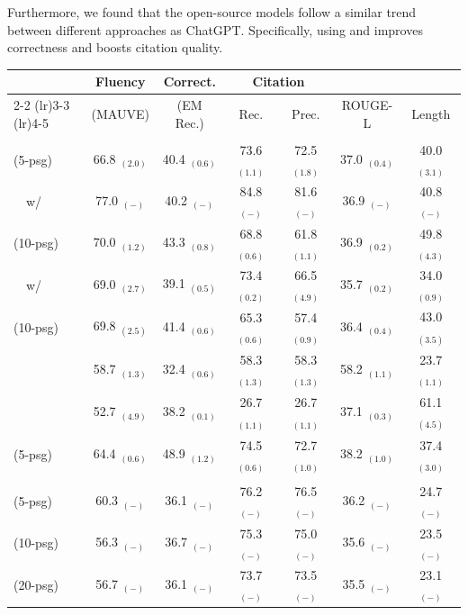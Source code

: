 \documentclass[11pt]{article}
\newcommand\tf[1]{\textbf{#1}}
\newcommand{\vani}{{\sc{Vanilla}}}
\newcommand{\summ}{{\sc{Summ}}}
\newcommand{\snippet}{{\sc{Snippet}}}
\newcommand{\interact}{{\sc{Interact}}}
\newcommand{\search}{{\sc{InlineSearch}}}
\newcommand{\rerank}{{\sc{Rerank}}}
\newcommand{\close}{{\sc{ClosedBook}}}
\newcommand{\oracle}{{\sc{Oracle}}}
\newcommand{\tableskip}{\noalign{\vskip 2pt}}
\newcommand{\headercolorlong}{\rowcolor{gray!17}}
\begin{document}
Furthermore, we found that the open-source models follow a similar trend between different approaches as ChatGPT. Specifically, using \summ{} and \snippet{} improves correctness and \rerank{} boosts citation quality. 



\begin{table}[h]
    \centering
    \small
        \begin{tabular}{lcccccc}
            \toprule
            & \tf{Fluency} & \tf{Correct.} & \multicolumn{2}{c}{\tf{Citation} }\\
            \cmidrule(lr){2-2} \cmidrule(lr){3-3} \cmidrule(lr){4-5}
            & (MAUVE) & (EM Rec.) & Rec. & Prec. & ROUGE-L & Length \\
            \midrule
            \headercolorlong
            \multicolumn{7}{c}{\textbf{ChatGPT}} \\
            \tableskip

            \vani{} (5-psg) & 66.8 $_{(2.0)}$ & 40.4 $_{(0.6)}$ & 73.6 $_{(1.1)}$ & 72.5 $_{(1.8)}$ & 37.0 $_{(0.4)}$ & 40.0 $_{(3.1)}$   \\
            ~~w/ \rerank{} & 77.0 $_{(-)}$ & 40.2 $_{(-)}$ & 84.8 $_{(-)}$ & 81.6 $_{(-)}$ & 36.9 $_{(-)}$ & 40.8 $_{(-)}$ \\
            \summ{} (10-psg) & 70.0 $_{(1.2)}$ & 43.3 $_{(0.8)}$ & 68.8 $_{(0.6)}$ &61.8  $_{(1.1)}$ & 36.9 $_{(0.2)}$ & 49.8 $_{(4.3)}$   \\
            ~~w/ \interact{}  & 69.0 $_{(2.7)}$ & 39.1 $_{(0.5)}$ & 73.4 $_{(0.2)}$ & 66.5 $_{(4.9)}$ & 35.7 $_{(0.2)}$ & 34.0 $_{(0.9)}$   \\
            \snippet{} (10-psg) & 69.8 $_{(2.5)}$ & 41.4 $_{(0.6)}$ & 65.3 $_{(0.6)}$ & 57.4 $_{(0.9)}$ & 36.4 $_{(0.4)}$ & 43.0 $_{(3.5)}$   \\
            \search{} & 58.7 $_{(1.3)}$ & 32.4 $_{(0.6)}$ & 58.3 $_{(1.3)}$ & 58.3 $_{(1.3)}$ & 58.2 $_{(1.1)}$ & 23.7 $_{(1.1)}$   \\
            \close{} & 52.7 $_{(4.9)}$ & 38.2 $_{(0.1)}$ & 26.7 $_{(1.1)}$ & 26.7 $_{(1.1)}$ & 37.1 $_{(0.3)}$ & 61.1 $_{(4.5)}$   \\
            \oracle (5-psg) & 64.4 $_{(0.6)}$ & 48.9 $_{(1.2)}$ & 74.5 $_{(0.6)}$ & 72.7 $_{(1.0)}$ & 38.2 $_{(1.0)}$ & 37.4 $_{(3.0)}$   \\


            \headercolorlong
            \tableskip
            \multicolumn{7}{c}{\textbf{ChatGPT-16K}} \\
            \tableskip
            \vani{} (5-psg)  & 60.3 $_{(-)}$&36.1 $_{(-)}$&76.2 $_{(-)}$&76.5 $_{(-)}$&36.2 $_{(-)}$&24.7 $_{(-)}$\\
            \vani{} (10-psg) & 56.3 $_{(-)}$&36.7 $_{(-)}$&75.3 $_{(-)}$&75.0 $_{(-)}$&35.6 $_{(-)}$&23.5 $_{(-)}$\\
            \vani{} (20-psg) & 56.7 $_{(-)}$&36.1 $_{(-)}$&73.7 $_{(-)}$&73.5 $_{(-)}$&35.5 $_{(-)}$&23.1 $_{(-)}$\\


\end{tabular}
\end{table}
\end{document}
